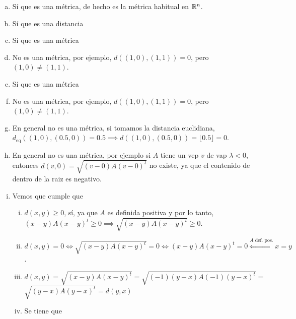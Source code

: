 \begin{ej}
	\begin{enumerate}[(a)]
		\item Sí que es una m\'etrica, de hecho es la m\'etrica habitual en $\mathbb{R}^n$.
			\begin{center}
				
			\end{center}
		\item Sí que es una distancia
			\begin{center}
				
			\end{center}
		\item Sí que es una m\'etrica
			\begin{center}
				
			\end{center}
		\item No es una m\'etrica, por ejemplo, $d\left( (1,0), (1,1) \right) = 0$, pero $(1,0) \neq (1,1)$.
		\item Sí que es una m\'etrica
			\begin{center}
				
			\end{center}
		\item No es una m\'etrica, por ejemplo, $d\left( (1,0), (1,1) \right) = 0$, pero $(1,0) \neq (1,1)$.
		\item En general no  es una m\'etrica, si tomamos la distancia euclidiana, $d_{\text{eq}} \left( (1, 0) , (0.5, 0) \right) = 0.5 \implies
			d\left( (1,0), (0.5, 0) \right) = \lfloor0.5 \rfloor = 0$.
		\item En general no es una m\'etrica, por ejemplo si $A$ tiene un vep $v$ de vap $\lambda < 0$, entonces $d(v, 0) = \sqrt{(v - 0) A (v-0)^t}$ no existe,
			ya que el contenido de dentro de la raiz es negativo.
		\item Vemos que cumple que
			\begin{enumerate}[i)]
				\item $d(x, y) \geq 0$, sí, ya que $A$ es definida positiva y por lo tanto, $(x-y)A(x-y)^t \geq 0 \implies \sqrt{(x-y)A(x-y)^t} \geq 0$.
				\item $d(x, y) = 0 \iff \sqrt{(x-y)A(x-y)^t} = 0 \iff (x-y)A(x-y)^t = 0 \stackrel{A \text{ def. pos.}}{\iff} x = y$.
				\item $d(x, y) = \sqrt{(x-y)A(x-y)^t} = \sqrt{(-1)(y-x)A(-1)(y-x)^t} =$ \\ $\sqrt{(y-x)A(y-x)^t} = d(y, x)$
				\item Se tiene que
					\begin{align*}

\end{align*}
\end{enumerate}
\end{enumerate}
\end{ej}
